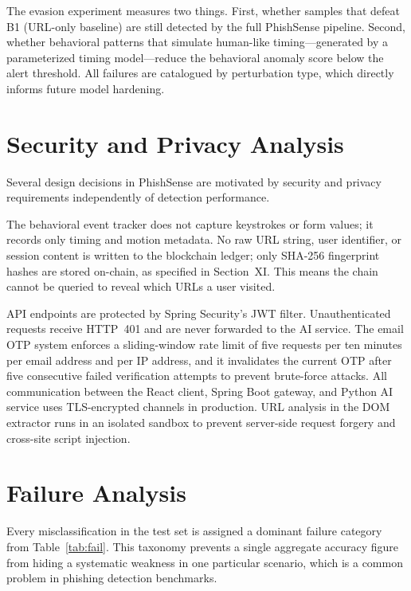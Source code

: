 \documentclass[conference]{IEEEtran}
\begin{document}
The evasion experiment measures two things.
First, whether samples that defeat B1 (URL-only baseline) are still detected by the full
PhishSense pipeline.
Second, whether behavioral patterns that simulate human-like timing---generated by a
parameterized timing model---reduce the behavioral anomaly score below the alert threshold.
All failures are catalogued by perturbation type, which directly informs future model hardening.

\section{Security and Privacy Analysis}

Several design decisions in PhishSense are motivated by security and privacy requirements
independently of detection performance.

The behavioral event tracker does not capture keystrokes or form values; it records only timing
and motion metadata.
No raw URL string, user identifier, or session content is written to the blockchain ledger;
only SHA-256 fingerprint hashes are stored on-chain, as specified in Section~XI.
This means the chain cannot be queried to reveal which URLs a user visited.

API endpoints are protected by Spring Security's JWT filter.
Unauthenticated requests receive HTTP~401 and are never forwarded to the AI service.
The email OTP system enforces a sliding-window rate limit of five requests per ten minutes per
email address and per IP address, and it invalidates the current OTP after five consecutive
failed verification attempts to prevent brute-force attacks.
All communication between the React client, Spring Boot gateway, and Python AI service uses
TLS-encrypted channels in production.
URL analysis in the DOM extractor runs in an isolated sandbox to prevent server-side request
forgery and cross-site script injection.

\section{Failure Analysis}

Every misclassification in the test set is assigned a dominant failure category from
Table~\ref{tab:fail}.
This taxonomy prevents a single aggregate accuracy figure from hiding a systematic weakness
in one particular scenario, which is a common problem in phishing detection benchmarks.
\end{document}
